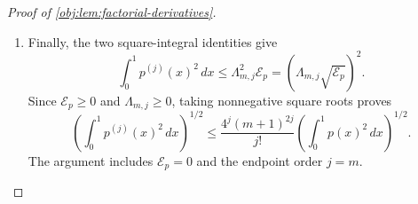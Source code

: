 \begin{proof}[Proof of \cref{obj:lem:factorial-derivatives}]
\begin{enumerate}
\item Finally, the two square-integral identities give
\[
\int_0^1 p^{(j)}(x)^2\,dx
\le
\Lambda_{m,j}^2\mathcal E_p
=
\left(\Lambda_{m,j}\sqrt{\mathcal E_p}\right)^2.
\]
Since \(\mathcal E_p\ge0\) and \(\Lambda_{m,j}\ge0\), taking nonnegative square roots proves
\[
\left(\int_0^1 p^{(j)}(x)^2\,dx\right)^{1/2}
\le
\frac{4^j(m+1)^{2j}}{j!}
\left(\int_0^1 p(x)^2\,dx\right)^{1/2}.
\]
The argument includes \(\mathcal E_p=0\) and the endpoint order \(j=m\).
\end{enumerate}
\end{proof}
